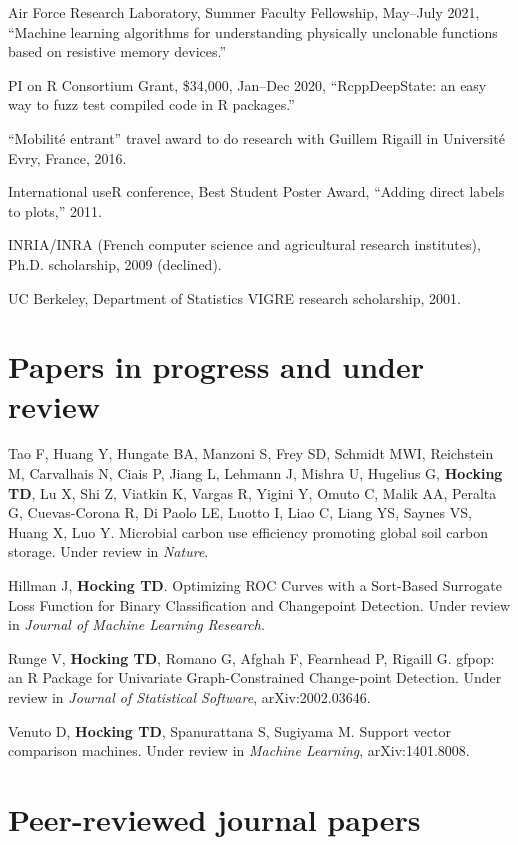 \documentclass[margin,line]{res}
\begin{document}
\begin{resume}
Air Force Research Laboratory, Summer Faculty Fellowship, May--July
2021, ``Machine learning algorithms for understanding physically
unclonable functions based on resistive memory devices.''

PI on R Consortium Grant, \$34,000, Jan--Dec 2020, ``RcppDeepState: an easy
way to fuzz test compiled code in R packages.''

``Mobilit\'e entrant'' travel award to do research with Guillem Rigaill in
Universit\'e Evry, France, 2016.

International useR conference, Best Student Poster Award, ``Adding
direct labels to plots,'' 2011.

INRIA/INRA (French computer science and agricultural research institutes), Ph.D. scholarship, 2009 (declined).

UC Berkeley, Department of Statistics VIGRE research scholarship, 2001.


\section{\sc Papers in progress and under review}

Tao F, Huang Y, Hungate BA, Manzoni S, Frey SD, Schmidt MWI,
Reichstein M, Carvalhais N, Ciais P, Jiang L, Lehmann J, Mishra U,
Hugelius G, {\bf Hocking TD}, Lu X, Shi Z, Viatkin K, Vargas R, Yigini
Y, Omuto C, Malik AA, Peralta G, Cuevas-Corona R, Di Paolo LE, Luotto
I, Liao C, Liang YS, Saynes VS, Huang X, Luo Y. Microbial carbon use
efficiency promoting global soil carbon storage. Under review in {\it
  Nature}.

Hillman J, {\bf Hocking TD}. Optimizing ROC Curves with a Sort-Based
Surrogate Loss Function for Binary Classification and Changepoint
Detection. Under review in {\it Journal of Machine Learning Research}.

Runge V, {\bf Hocking TD}, Romano G, Afghah F, Fearnhead P, Rigaill
G. gfpop: an R Package for Univariate Graph-Constrained Change-point
Detection. Under review in {\it Journal of Statistical Software},
arXiv:2002.03646.

Venuto D, {\bf Hocking TD}, Spanurattana S, Sugiyama M. Support vector
comparison machines. Under review in {\it Machine Learning},
arXiv:1401.8008.

\section{\sc Peer-reviewed journal papers}


\end{resume}
\end{document}
